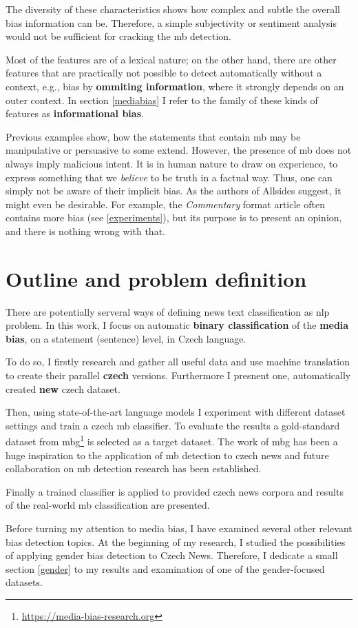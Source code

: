 The diversity of these characteristics shows how complex and subtle the overall bias information can be. Therefore, a simple subjectivity or sentiment analysis would not be sufficient for cracking the \gls{mb} detection. 

Most of the features are of a lexical nature; on the other hand, there are other features that are practically not possible to detect automatically without a context, e.g., bias by \textbf{ommiting information}, where it strongly depends on an outer context. In section \ref{mediabias} I refer to the family of these kinds of features as \textbf{informational bias}.


Previous examples show, how the statements that contain \gls{mb} may be manipulative or persuasive to some extend. However, the presence of \gls{mb} does not always imply malicious intent. It is in human nature to draw on experience, to express something that we \textit{believe} to be truth in a factual way. Thus, one can simply not be aware of their implicit bias. As the authors of Allsides suggest, it might even be desirable. For example, the \textit{Commentary} format article often contains more bias (see \ref{experiments}), but its purpose is to present an opinion, and there is nothing wrong with that.


\section{Outline and problem definition}
There are potentially serveral ways of defining news text classification as \gls{nlp} problem.
In this work, I focus on automatic \textbf{binary classification} of the \textbf{media bias}, on a statement (sentence) level, in Czech language.

To do so, I firstly research and gather all useful data and use machine translation to create their parallel \textbf{czech} versions. Furthermore I presnent one, automatically created \textbf{new} czech dataset. 

Then, using state-of-the-art language models I experiment with different dataset settings and train a czech \gls{mb} classifier. To evaluate the results a gold-standard dataset from \gls{mbg}\footnote{\url{https://media-bias-research.org}} is selected as a target dataset. The work of \gls{mbg} has been a huge inspiration to the application of \gls{mb} detection to czech news and future collaboration on \gls{mb} detection research has been established.

Finally a trained classifier is applied to provided czech news corpora and results of the real-world \gls{mb} classification are presented.

Before turning my attention to media bias, I have examined several other relevant bias detection topics. At the beginning of my research, I studied the possibilities of applying gender bias detection to Czech News. Therefore, I dedicate a small section \ref{gender} to my results and examination of one of the gender-focused datasets.



